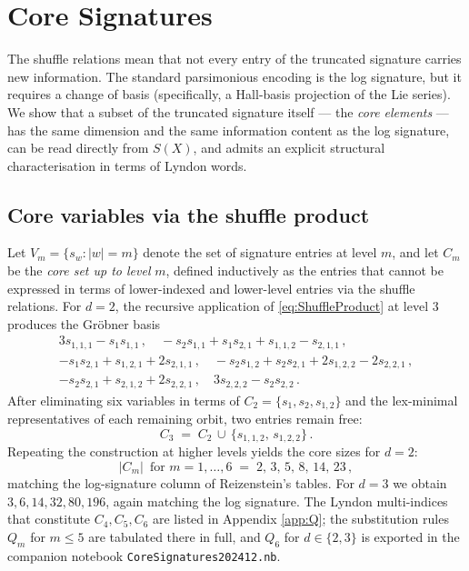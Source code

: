 \documentclass[11pt,english]{article}
\newcommand{\nbfile}[1]{\nolinkurl{#1}}
\begin{document}
\section{Core Signatures\label{sec:Core}}

The shuffle relations mean that not every entry of the truncated signature
carries new information. The standard parsimonious encoding is the
log signature, but it requires a change of basis (specifically, a
Hall-basis projection of the Lie series). We show that a subset of
the truncated signature itself --- the \emph{core elements} --- has
the same dimension and the same information content as the log signature,
can be read directly from $S(X)$, and admits an explicit structural
characterisation in terms of Lyndon words.

\subsection{Core variables via the shuffle product}

Let $V_{m}=\{s_{w}:|w|=m\}$ denote the set of signature entries at
level $m$, and let $C_{m}$ be the \emph{core set up to level} $m$,
defined inductively as the entries that cannot be expressed in terms
of lower-indexed and lower-level entries via the shuffle relations.
For $d=2$, the recursive application of \eqref{eq:ShuffleProduct}
at level 3 produces the Gröbner basis
\[
\begin{array}{l}
3s_{1,1,1}-s_{1}s_{1,1}\,,\quad-s_{2}s_{1,1}+s_{1}s_{2,1}+s_{1,1,2}-s_{2,1,1}\,,\\
-s_{1}s_{2,1}+s_{1,2,1}+2s_{2,1,1}\,,\quad-s_{2}s_{1,2}+s_{2}s_{2,1}+2s_{1,2,2}-2s_{2,2,1}\,,\\
-s_{2}s_{2,1}+s_{2,1,2}+2s_{2,2,1}\,,\quad3s_{2,2,2}-s_{2}s_{2,2}\,.
\end{array}
\]
After eliminating six variables in terms of $C_{2}=\{s_{1},s_{2},s_{1,2}\}$
and the lex-minimal representatives of each remaining orbit, two entries
remain free:
\[
C_{3}\;=\;C_{2}\,\cup\,\{s_{1,1,2},\,s_{1,2,2}\}\,.
\]
Repeating the construction at higher levels yields the core sizes
for $d=2$:
\begin{equation}
|C_{m}|\,\text{ for }m=1,\ldots,6\;=\;2,\,3,\,5,\,8,\,14,\,23\,,\label{eq:CoreSizesD2}
\end{equation}
matching the log-signature column of Reizenstein's tables. For $d=3$
we obtain $3,6,14,32,80,196$, again matching the log signature. The
Lyndon multi-indices that constitute $C_{4},C_{5},C_{6}$ are listed
in Appendix \ref{app:Q}; the substitution rules $Q_{m}$ for $m\leq5$
are tabulated there in full, and $Q_{6}$ for $d\in\{2,3\}$ is exported
in the companion notebook \nbfile{CoreSignatures202412.nb}.
\end{document}
